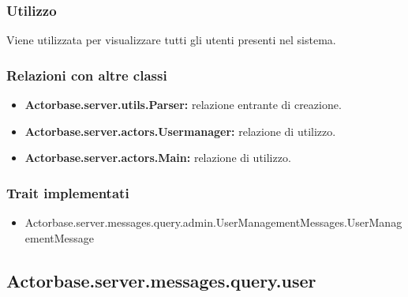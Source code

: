 \documentclass[a4paper]{article}
\begin{document}
			\subsubsection{Utilizzo}
				Viene utilizzata per visualizzare tutti gli utenti presenti nel sistema.
				
			\subsubsection{Relazioni con altre classi}
				\begin{itemize}
					\item \textbf{Actorbase.server.utils.Parser:} relazione entrante di creazione.
					\item \textbf{Actorbase.server.actors.Usermanager:} relazione di utilizzo.
					\item \textbf{Actorbase.server.actors.Main:} relazione di utilizzo.
				\end{itemize}
			\subsubsection{Trait implementati}
				\begin{itemize}
					\item Actorbase.server.messages.query.admin.UserManagementMessages.UserManagementMessage
				\end{itemize}
			
		\subsection{Actorbase.server.messages.query.user}
		
\end{document}
